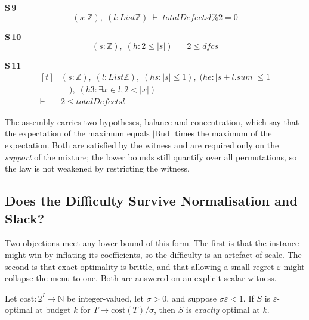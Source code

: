 \noindent\textbf{S\,9}\quad{}
{\footnotesize\[ (\mathit{s} : \mathbb{Z} ),\; (\mathit{l} : \mathit{List} \mathbb{Z} ) \;\vdash\; \mathit{totalDefect} \mathit{s} \mathit{l} \% 2 = 0 \]}

\noindent\textbf{S\,10}\quad{}
{\footnotesize\[ (\mathit{s} : \mathbb{Z} ),\; (\mathit{h} : 2 \leq |\mathit{s}|) \;\vdash\; 2 \leq \mathit{dfc} \mathit{s} \]}

\noindent\textbf{S\,11}\quad{}
{\footnotesize\[ \begin{aligned}[t]
&(\mathit{s} : \mathbb{Z} ),\; (\mathit{l} : \mathit{List} \mathbb{Z} ),\; (\mathit{hs} : |\mathit{s}| \leq 1),\; (\mathit{he} : |\mathit{s} + \mathit{l}.\mathit{sum}| \leq 1\\
&\quad ),\; (\mathit{h3} : \exists \mathit{x} \in \mathit{l}, 2 < |\mathit{x}|)\\
\vdash\;&2 \leq \mathit{totalDefect} \mathit{s} \mathit{l}
\end{aligned} \]}


The assembly carries two hypotheses, balance and concentration, which say that the
expectation of the maximum equals $|\mathrm{Bud}|$ times the maximum of the expectation. Both
are satisfied by the witness and are required only on the \emph{support} of the mixture; the
lower bounds still quantify over all permutations, so the law is not weakened by restricting
the witness.

\subsection{Does the Difficulty Survive Normalisation and Slack?}
\label{sec:tolerance}

Two objections meet any lower bound of this form. The first is that the instance might win by
inflating its coefficients, so the difficulty is an artefact of scale. The second is that
exact optimality is brittle, and that allowing a small regret $\varepsilon$ might collapse the
menu to one. Both are answered on an explicit scalar witness.

\begin{theorem}
\label{thm:grid}
Let $\mathrm{cost}:2^{I}\to\mathbb{N}$ be integer-valued, let $\sigma>0$, and suppose
$\sigma\varepsilon<1$. If $S$ is $\varepsilon$-optimal at budget $k$ for
$T\mapsto\mathrm{cost}(T)/\sigma$, then $S$ is \emph{exactly} optimal at $k$.
\end{theorem}


